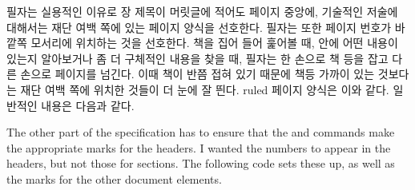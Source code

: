 필자는 실용적인 이유로 장 제목이 머릿글에 적어도 페이지 중앙에, 기술적인 저술에
대해서는 재단 여백 쪽에 있는 페이지 양식을 선호한다.
필자는 또한 페이지 번호가 바깥쪽 모서리에 위치하는 것을 선호한다.
책을 집어 들어 훑어볼 때, 안에 어떤 내용이 있는지 알아보거나 좀 더 구체적인
내용을 찾을 때, 필자는 한 손으로 책 등을 잡고 다른 손으로 페이지를 넘긴다.
이때 책이 반쯤 접혀 있기 때문에 책등 가까이 있는 것보다는 재단 여백 쪽에 위치한
것들이 더 눈에 잘 띈다.
ruled 페이지 양식은 이와 같다.
일반적인 내용은 다음과 같다.
\begin{lcode}
\end{lcode}
The other part of the specification has to ensure that the \cmd{\chapter}
and \cmd{\section} commands make the appropriate marks for the headers.
I wanted the numbers to appear in the headers, but not those for sections. The following
code sets these up, as well as the marks for the other document elements.
\begin{lcode}
\end{lcode}

